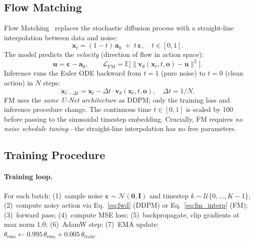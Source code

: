 \documentclass[10pt,letterpaper]{article}
\begin{document}
\subsection{Flow Matching}

Flow Matching~\citep{lipman2023flow,liu2023rectified} replaces the stochastic
diffusion process with a straight-line interpolation between data and noise:
\begin{equation}
  \mathbf{x}_t = (1{-}t)\,\mathbf{a}_0 \;+\; t\,\boldsymbol{\varepsilon},
  \quad t \in [0, 1].
  \label{eq:fm_interp}
\end{equation}
The model predicts the \textit{velocity} (direction of flow in action space):
\begin{equation}
  \mathbf{u} = \boldsymbol{\varepsilon} - \mathbf{a}_0, \qquad
  \mathcal{L}_{\text{FM}} = \mathbb{E}\bigl[\|\mathbf{v}_\theta(\mathbf{x}_t, t, \mathbf{o}) - \mathbf{u}\|^2\bigr].
  \label{eq:fm_loss}
\end{equation}
Inference runs the Euler ODE backward from $t{=}1$ (pure noise) to $t{=}0$
(clean action) in $N$ steps:
\begin{equation}
  \mathbf{x}_{t - \Delta t} = \mathbf{x}_t - \Delta t \cdot \mathbf{v}_\theta(\mathbf{x}_t, t, \mathbf{o}),
  \quad \Delta t = 1/N.
  \label{eq:fm_euler}
\end{equation}
FM uses the \emph{same U-Net architecture} as DDPM; only the training loss and
inference procedure change.
The continuous time $t \in [0,1]$ is scaled by 100 before passing to the
sinusoidal timestep embedding.
Crucially, FM requires \emph{no noise schedule tuning}---the straight-line
interpolation has no free parameters.

\subsection{Training Procedure}

\paragraph{Training loop.}
For each batch: (1)~sample noise $\boldsymbol{\varepsilon} \sim \mathcal{N}(\mathbf{0}, \mathbf{I})$ and
timestep $k \sim \mathcal{U}\{0, \ldots, K{-}1\}$; (2)~compute noisy action via
Eq.~\eqref{eq:fwd} (DDPM) or Eq.~\eqref{eq:fm_interp} (FM); (3)~forward pass;
(4)~compute MSE loss; (5)~backpropagate, clip gradients at max norm 1.0;
(6)~AdamW step; (7)~EMA update: $\theta_{\text{ema}} \leftarrow 0.995\,\theta_{\text{ema}} + 0.005\,\theta_{\text{train}}$.
\end{document}
